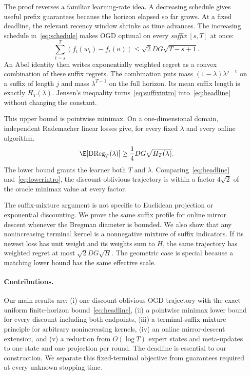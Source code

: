 \documentclass{article}
\newcommand{\DReg}{\operatorname{DReg}}
\begin{document}
The proof reverses a familiar learning-rate idea. A decreasing schedule gives useful prefix guarantees because the horizon elapsed so far grows. At a fixed deadline, the relevant recency window shrinks as time advances. The increasing schedule in~\eqref{eq:schedule} makes OGD optimal on every \emph{suffix} $[s,T]$ at once:
\begin{equation}
\sum_{t=s}^T(f_t(w_t)-f_t(u))\le\sqrt2DG\sqrt{T-s+1}.
\label{eq:suffixintro}
\end{equation}
An Abel identity then writes exponentially weighted regret as a convex combination of these suffix regrets. The combination puts mass $(1-\lambda)\lambda^{j-1}$ on a suffix of length $j$ and mass $\lambda^{T-1}$ on the full horizon. Its mean suffix length is exactly $H_T(\lambda)$. Jensen's inequality turns~\eqref{eq:suffixintro} into~\eqref{eq:headline} without changing the constant.

This upper bound is pointwise minimax. On a one-dimensional domain, independent Rademacher linear losses give, for every fixed $\lambda$ and every online algorithm,
\begin{equation}
\E[\DReg_T(\lambda)]\ge\frac14DG\sqrt{H_T(\lambda)}.
\label{eq:lowerintro}
\end{equation}
The lower bound grants the learner both $T$ and $\lambda$. Comparing~\eqref{eq:headline} and~\eqref{eq:lowerintro}, the discount-oblivious trajectory is within a factor $4\sqrt2$ of the oracle minimax value at every factor.

The suffix-mixture argument is not specific to Euclidean projection or exponential discounting. We prove the same suffix profile for online mirror descent whenever the Bregman diameter is bounded. We also show that any nonincreasing terminal kernel is a nonnegative mixture of suffix indicators. If its newest loss has unit weight and its weights sum to $H$, the same trajectory has weighted regret at most $\sqrt{2}DG\sqrt H$. The geometric case is special because a matching lower bound has the same effective scale.

\paragraph{Contributions.} Our main results are: (i) one discount-oblivious OGD trajectory with the exact uniform finite-horizon bound~\eqref{eq:headline}, (ii) a pointwise minimax lower bound for every discount including both endpoints, (iii) a terminal-suffix mixture principle for arbitrary nonincreasing kernels, (iv) an online mirror-descent extension, and (v) a reduction from $O(\log T)$ expert states and meta-updates to one state and one projection per round. The deadline is essential to our construction. We separate this fixed-terminal objective from guarantees required at every unknown stopping time.
\end{document}
